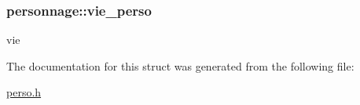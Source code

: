 \subsubsection[{\texorpdfstring{vie\+\_\+perso}{vie_perso}}]{ personnage\+::vie\+\_\+perso}\hypertarget{structpersonnage_ac96f4aee44111bc31a7718e5762bf483}{}\label{structpersonnage_ac96f4aee44111bc31a7718e5762bf483}
vie 

The documentation for this struct was generated from the following file\+:\begin{DoxyCompactItemize}
\item 
\hyperlink{perso_8h}{perso.\+h}\end{DoxyCompactItemize}
